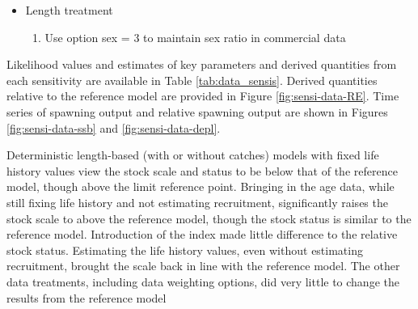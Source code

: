 \documentclass[11pt,
  english,
  a4paper,
]{article}
\begin{document}
\begin{itemize}
  \tagstructend
\item

  Length treatment

  \tagmcend\tagstructend\tagstructend


  \begin{enumerate}
  \def\labelenumi{\arabic{enumi}.}
  \setcounter{enumi}{11}
  \item


    Use option sex = 3 to maintain sex ratio in commercial data

    \tagmcend\tagstructend\tagstructend

    \tagmcend\tagstructend\tagstructend
  \end{enumerate}

  \tagstructend
\end{itemize}

\tagstructend


Likelihood values and estimates of key parameters and derived quantities from each sensitivity are available in Table \ref{tab:data_sensis}. Derived quantities relative to the reference model are provided in Figure \ref{fig:sensi-data-RE}. Time series of spawning output and relative spawning output are shown in Figures \ref{fig:sensi-data-ssb} and \ref{fig:sensi-data-depl}.

\leavevmode\tagmcend\tagstructend\par


Deterministic length-based (with or without catches) models with fixed life history values view the stock scale and status to be below that of the reference model, though above the limit reference point. Bringing in the age data, while still fixing life history and not estimating recruitment, significantly raises the stock scale to above the reference model, though the stock status is similar to the reference model. Introduction of the index made little difference to the relative stock status. Estimating the life history values, even without estimating recruitment, brought the scale back in line with the reference model. The other data treatments, including data weighting options, did very little to change the results from the reference model
\end{document}
